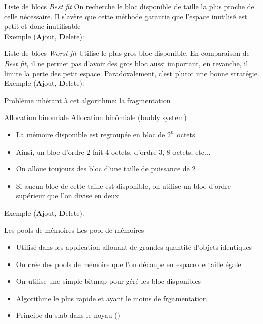\begin{frame}{Liste de blocs}
  \emph{Best fit}  On recherche le  bloc disponible de taille  la plus
  proche de  celle nécessaire.  Il s'avère que  cette méthode garantie
  que l'espace inutilisé est petit et donc inutilisable
  \\
  Exemple (\textbf{A}jout, \textbf{D}elete):
  \begin{center}
  \end{center}
\end{frame}

\begin{frame}{Liste de blocs}
  \emph{Worst  fit}   Utilise  le   plus  gros  bloc   disponible.  En
  comparaison de  \emph{Best fit}, il  ne permet pas d'avoir  des gros
  bloc  aussi important,  en revanche,  il limite  la perte  des petit
  espace.  Paradoxalement, c'est plutot une bonne stratégie.
  \\
  Exemple (\textbf{A}jout, \textbf{D}elete):
  \begin{center}
  \end{center}
   Problème inhérant à cet algorithme: la fragmentation
\end{frame}

\begin{frame}[fragile=singleslide]{Allocation binomiale}
  Allocation binômiale (buddy system)
  \begin{itemize}
  \item La mémoire disponible est regroupée en bloc de $2^n$ octets
  \item Ainsi, un  bloc d'ordre 2 fait 4 octets,  d'ordre 3, 8 octets,
    etc...
  \item On alloue toujours des bloc d'une taille de puissance de 2
  \item Si  aucun bloc de cette  taille est disponible,  on utilise un
    bloc d'ordre supérieur que l'on divise en deux
  \end{itemize}
  Exemple (\textbf{A}jout, \textbf{D}elete):
  \begin{center}
  \end{center}
\end{frame}

\begin{frame}[fragile=singleslide]{Les pools de mémoires}
  Les pool de mémoires
  \begin{itemize}
  \item  Utilisé dans  les  application allouant  de grandes  quantité
    d'objets identiques
  \item On  crée des pools  de mémoire que  l'on découpe en  espace de
    taille égale
  \item On utilise une simple bitmap pour géré les bloc disponibles
  \item Algorithme le plus rapide et ayant le moins de frgamentation
  \item Principe du slab dans le noyau ()
  \end{itemize}
\end{frame}

